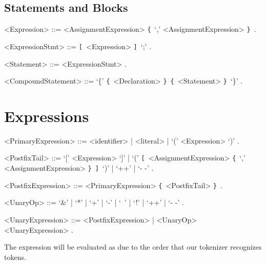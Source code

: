 \documentclass{article}
\def\lrep{\synshortsoff\texttt{\{}\synshorts~}
\def\rrep{\synshortsoff\texttt{\}}\synshorts~}
\def\lopt{\synshortsoff\texttt{[}\synshorts~}
\def\ropt{\synshortsoff\texttt{]}\synshorts~}
\begin{document}
\subsection*{Statements and Blocks}

\begin{grammar}
  <Expression> ::= <AssignmentExpression> \lrep `,' <AssignmentExpression> \rrep .
  
  <ExpressionStmt> ::= \lopt <Expression> \ropt `;' .

  <Statement> ::= <ExpressionStmt> .
  
  <CompoundStatement> ::= `\{' \lrep <Declaration> \rrep \lrep <Statement>
  \rrep `\}' .
\end{grammar}

\section*{Expressions}


\begin{grammar}
  <PrimaryExpression> ::= <identifier> | <literal> | `(' <Expression> `)' .

  <PostfixTail> ::= `[' <Expression> `]' | `(' \lopt <AssignmentExpression>
  \lrep `,' <AssignmentExpression> \rrep \ropt `)' | `++' | `- -' .

  <PostfixExpression> ::= <PrimaryExpression> \lrep <PostfixTail> \rrep .

  <UnaryOp> ::= `&' | `*' | `+' | `-' | `~' | `!' | `++' | `- -' .

  <UnaryExpression> ::= <PostfixExpression> | <UnaryOp> <UnaryExpression> .
\end{grammar}
The expression  will be evaluated as  due to the
order that our tokenizer recognizes tokens.
\end{document}
